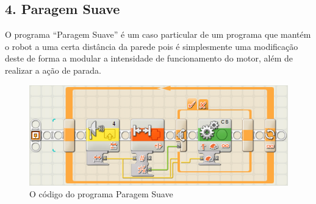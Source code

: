 \documentclass{article}
\begin{document}
\subsection*{4. Paragem Suave}
O programa ``Paragem Suave'' é um caso particular de um programa que mantém o robot a uma certa
distância da parede pois é simplesmente uma modificação deste de forma a modular a intensidade
de funcionamento do motor, além de realizar a ação de parada.
\begin{figure}[H]
    \centering
    \includegraphics[scale=.5]{paragem-suaved}
    \caption{O código do programa Paragem Suave}
\end{figure}
\end{document}
